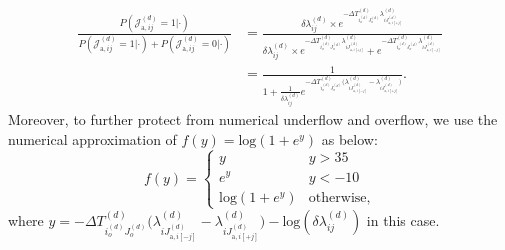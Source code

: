 \documentclass[a4paper]{article}
\begin{document}
              \begin{equation}
              \begin{aligned}
              \frac{P(\mathcal{J}^{(d)}_{\mbox{a}, ij}=1|\cdot)}{P(\mathcal{J}^{(d)}_{\mbox{a}, ij}=1|\cdot) + P(\mathcal{J}^{(d)}_{\mbox{a}, ij}=0|\cdot)} 
             & = \frac{\delta\lambda^{(d)}_{ij}\times e^{-\Delta T^{(d)}_{i_o^{(d)}J_o^{(d)}}\lambda^{(d)}_{iJ^{(d)}_{\mbox{a}, i[+j]}}}}{\delta\lambda^{(d)}_{ij}\times e^{-\Delta T^{(d)}_{i_o^{(d)}J_o^{(d)}}\lambda^{(d)}_{iJ^{(d)}_{\mbox{a}, i[+j]}}} + e^{-\Delta T^{(d)}_{i_o^{(d)}J_o^{(d)}}\lambda^{(d)}_{iJ^{(d)}_{\mbox{a}, i[-j]}}} }\\&
              = \frac{1}{1+ \frac{1}{\delta\lambda^{(d)}_{ij}}e^{-\Delta T^{(d)}_{i_o^{(d)}J_o^{(d)}}\big(\lambda^{(d)}_{iJ^{(d)}_{\mbox{a}, i[-j]}} - \lambda^{(d)}_{iJ^{(d)}_{\mbox{a}, i[+j]}} \big)}}.
              \end{aligned}
              \end{equation}
         Moreover, to further protect from numerical underflow and overflow, we use the numerical approximation of $f(y) = \mbox{log}(1+ e^y)$ as below: 
         \begin{equation*}
         f(y) = \begin{cases}
         y &y >35\\
         e^y & y<-10\\
         \mbox{log}(1+e^y) & \mbox{otherwise},
         \end{cases}
         \end{equation*}
         where $y = -\Delta T^{(d)}_{i_o^{(d)}J_o^{(d)}}\big(\lambda^{(d)}_{iJ^{(d)}_{\mbox{a}, i[-j]}} - \lambda^{(d)}_{iJ^{(d)}_{\mbox{a}, i[+j]}}\big)- \mbox{log}(\delta\lambda^{(d)}_{ij})$ in this case.
\end{document}
